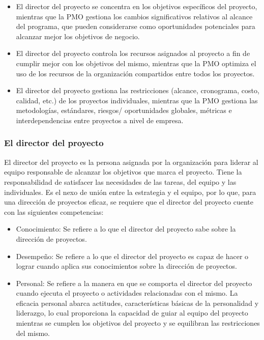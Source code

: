 \begin{itemize}

\item{El director del proyecto se concentra en los objetivos específicos del proyecto, mientras que la PMO 
gestiona los cambios significativos relativos al alcance del programa, que pueden considerarse como 
oportunidades potenciales para alcanzar mejor los objetivos de negocio.}

\item{El  director  del  proyecto  controla  los  recursos  asignados  al  proyecto  a  fin  de  cumplir  mejor  con  
los  objetivos  del  mismo,  mientras  que  la  PMO  optimiza  el  uso  de  los  recursos  de  la  organización  
compartidos entre todos los proyectos.}

\item{El  director  del  proyecto  gestiona  las  restricciones  (alcance,  cronograma,  costo,  calidad,  etc.)  de  
los  proyectos  individuales,  mientras  que  la  PMO  gestiona  las  metodologías,  estándares,  riesgos/
oportunidades globales, métricas e interdependencias entre proyectos a nivel de empresa.}

\end{itemize}

\subsubsection{El director del proyecto}

El director del proyecto es la persona asignada por la organización para liderar al equipo responsable de alcanzar los objetivos que marca el proyecto. Tiene la responsabilidad de satisfacer las necesidades de las tareas, del equipo y las individuales. Es el nexo de unión entre la estrategia y el equipo, por lo que, para una dirección de proyectos eficaz, se requiere que el director del proyecto cuente con las siguientes competencias:

\begin{itemize}

\item{Conocimiento: Se refiere a lo que el director del proyecto sabe sobre la dirección de proyectos.}

\item{Desempeño: Se refiere a lo que el director del proyecto es capaz de hacer o lograr cuando aplica sus 
conocimientos sobre la dirección de proyectos.}

\item{Personal: Se  refiere  a  la  manera  en  que  se  comporta  el  director  del  proyecto  cuando  ejecuta  
el  proyecto  o  actividades  relacionadas  con  el  mismo.  La  eficacia  personal  abarca  actitudes,  
características básicas de la personalidad y liderazgo, lo cual proporciona la capacidad de guiar al 
equipo del proyecto mientras se cumplen los objetivos del proyecto y se equilibran las restricciones 
del mismo.}

\end{itemize}

